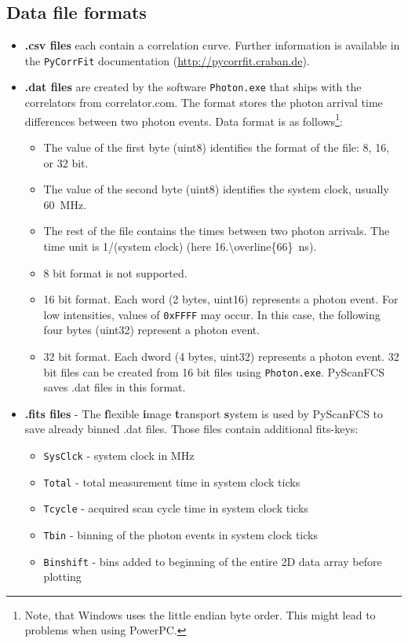 \subsection{Data file formats}
\begin{itemize}

\item \textbf{\mytilde .csv files} each contain a correlation curve. Further information is available in the \texttt{PyCorrFit} documentation (\url{http://pycorrfit.craban.de}).

\label{sec:datformat}
\item \textbf{\mytilde .dat files} are created by the software \texttt{Photon.exe} that ships with the correlators from correlator.com. The format stores the photon arrival time differences between two photon events. Data format is as follows\footnote{Note, that Windows uses the little endian byte order. This might lead to problems when using PowerPC.}:
	\begin{itemize}
	\item The value of the first byte (uint8) identifies the format of the file: 8, 16, or 32 bit.
	\item The value of the second byte (uint8) identifies the system clock, usually \SI{60}{MHz}.
	\item The rest of the file contains the times between two photon arrivals. The time unit is 1/(system clock) (here \SI{16.\overline{66}}{ns}).
	\item 8 bit format is not supported.
	\item 16 bit format. Each word (2 bytes, uint16) represents a photon event. For low intensities, values of \texttt{0xFFFF} may occur. In this case, the following four bytes (uint32) represent a photon event.
	\item 32 bit format. Each dword (4 bytes, uint32) represents a photon event. 32 bit files can be created from 16 bit files using \texttt{Photon.exe}. PyScanFCS saves \mytilde .dat files in this format.
 	\end{itemize}
\item \textbf{\mytilde .fits files} - The \textbf{f}lexible \textbf{i}mage \textbf{t}ransport \textbf{s}ystem is used by PyScanFCS to save already binned \mytilde .dat files. Those files contain additional fits-keys:
	\begin{itemize}
	\item \texttt{SysClck} - system clock in MHz
	\item \texttt{Total} - total measurement time in system clock ticks
	\item \texttt{Tcycle} - acquired scan cycle time in system clock ticks
	\item \texttt{Tbin} - binning of the photon events in system clock ticks
	\item \texttt{Binshift} - bins added to beginning of the entire 2D data array before plotting


\end{itemize}
\end{itemize}
